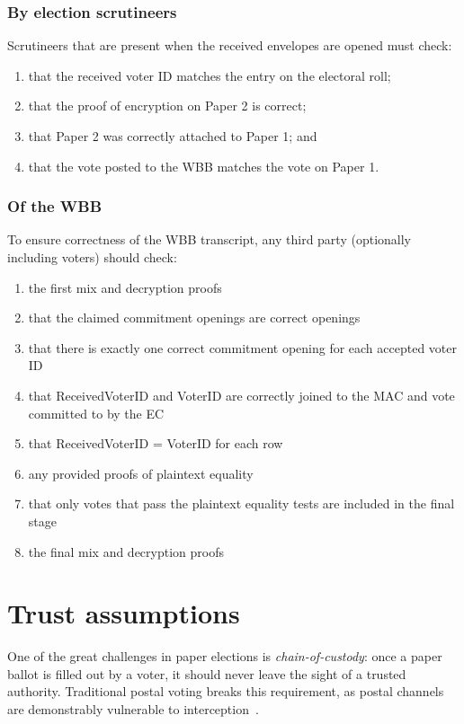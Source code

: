 \documentclass[11pt,twoside,a4paper]{article}
\theoremstyle{definition}
\begin{document}
\subsubsection{By election scrutineers}
Scrutineers that are present when the received envelopes are opened must check:
\begin{enumerate}
	\item that the received voter ID matches the entry on the electoral roll;
	\item that the proof of encryption on Paper 2 is correct;
	\item that Paper 2 was correctly attached to Paper 1; and
	\item that the vote posted to the WBB matches the vote on Paper 1.
\end{enumerate}

\subsubsection{Of the WBB}
To ensure correctness of the WBB transcript, any third party (optionally including voters) should check:
\begin{enumerate}
	\item the first mix and decryption proofs
	\item that the claimed commitment openings are correct openings
	\item that there is exactly one correct commitment opening for each accepted voter ID
	\item that ReceivedVoterID and VoterID are correctly joined to the MAC and vote committed to by the EC
	\item that ReceivedVoterID = VoterID for each row
	\item any provided proofs of plaintext equality
	\item that only votes that pass the plaintext equality tests are included in the final stage
	\item the final mix and decryption proofs
\end{enumerate}
\section{Trust assumptions}
One of the great challenges in paper elections is \textit{chain-of-custody}: once a paper ballot is filled out by a voter, it should never leave the sight of a trusted authority. Traditional postal voting breaks this requirement, as postal channels are demonstrably vulnerable to interception~\cite{stewart2010losing}.
\end{document}

